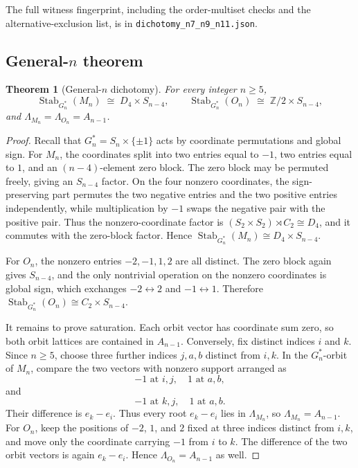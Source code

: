 \documentclass[11pt,a4paper]{article}
\newtheorem{theorem}{Theorem}[section]
\theoremstyle{definition}
\theoremstyle{remark}
\providecommand{\Z}{\mathbb{Z}}
\providecommand{\Stab}{\operatorname{Stab}}
\begin{document}
The full witness fingerprint, including the order-multiset checks
and the alternative-exclusion list, is in
\texttt{dichotomy\_n7\_n9\_n11.json}.

\subsection{\texorpdfstring{General-$n$ theorem}{General-n theorem}}\label{sec:dichotomy-general}

\begin{theorem}[General-$n$ dichotomy]\label{thm:universal-dichotomy}
For every integer $n \ge 5$,
\begin{equation*}
   \Stab_{G^*_n}(M_n) \;\cong\; D_4 \times S_{n-4},
   \qquad
   \Stab_{G^*_n}(O_n) \;\cong\; \Z/2 \times S_{n-4},
\end{equation*}
and $\Lambda_{M_n} = \Lambda_{O_n} = A_{n-1}$.
\end{theorem}

\begin{proof}
Recall that $G^*_n = S_n \times \{\pm 1\}$ acts by coordinate
permutations and global sign. For $M_n$, the coordinates split into
two entries equal to $-1$, two entries equal to $1$, and an
$(n-4)$-element zero block. The zero block may be permuted freely,
giving an $S_{n-4}$ factor. On the four nonzero coordinates, the
sign-preserving part permutes the two negative entries and the two
positive entries independently, while multiplication by $-1$ swaps the
negative pair with the positive pair. Thus the nonzero-coordinate
factor is $(S_2 \times S_2) \rtimes C_2 \cong D_4$, and it commutes
with the zero-block factor. Hence
$\Stab_{G^*_n}(M_n) \cong D_4 \times S_{n-4}$.

For $O_n$, the nonzero entries $-2,-1,1,2$ are all distinct. The
zero block again gives $S_{n-4}$, and the only nontrivial operation on
the nonzero coordinates is global sign, which exchanges
$-2 \leftrightarrow 2$ and $-1 \leftrightarrow 1$. Therefore
$\Stab_{G^*_n}(O_n) \cong C_2 \times S_{n-4}$.

It remains to prove saturation. Each orbit vector has coordinate sum
zero, so both orbit lattices are contained in $A_{n-1}$. Conversely,
fix distinct indices $i$ and $k$. Since $n \ge 5$, choose three
further indices $j,a,b$ distinct from $i,k$. In the $G^*_n$-orbit of
$M_n$, compare the two vectors with nonzero support arranged as
\begin{equation*}
   -1 \text{ at } i,j,
   \quad 1 \text{ at } a,b,
\end{equation*}
and
\begin{equation*}
   -1 \text{ at } k,j,
   \quad 1 \text{ at } a,b.
\end{equation*}
Their difference is $e_k-e_i$. Thus every root $e_k-e_i$ lies in
$\Lambda_{M_n}$, so $\Lambda_{M_n}=A_{n-1}$. For $O_n$, keep the
positions of $-2$, $1$, and $2$ fixed at three indices distinct from
$i,k$, and move only the coordinate carrying $-1$ from $i$ to $k$.
The difference of the two orbit vectors is again $e_k-e_i$. Hence
$\Lambda_{O_n}=A_{n-1}$ as well.
\end{proof}
\end{document}

